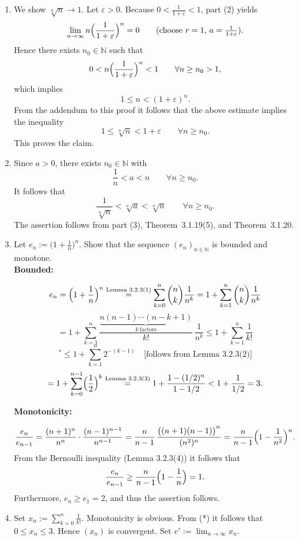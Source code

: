 \documentclass[12pt]{article}
\newcommand{\N}{\mathbb{N}}
\newcommand{\eps}{\varepsilon}
\begin{document}
\begin{enumerate}[label=(\arabic*),leftmargin=*]
    \item We show $\sqrt[n]{n}\to 1$. Let $\eps>0$. Because $0<\frac1{1+\eps}<1$, part (2) yields
    \[
        \lim_{n\to\infty} n\Bigl(\frac1{1+\eps}\Bigr)^n = 0
        \qquad\text{(choose $r=1$, $a=\tfrac1{1+\eps}$).}
    \]
    Hence there exists $n_0\in\N$ such that
    \[
        0 < n\Bigl(\frac1{1+\eps}\Bigr)^n < 1 \qquad\forall n\ge n_0 > 1,
    \]
    which implies
    \[
        1 \le n < (1+\eps)^n.
    \]
    From the addendum to this proof it follows that the above estimate implies the inequality
    \[
        1 \le \sqrt[n]{n} < 1+\eps \qquad\forall n\ge n_0.
    \]
    This proves the claim.

    \item Since $a>0$, there exists $n_0\in\N$ with
    \[
        \frac1n < a < n \qquad\forall n\ge n_0.
    \]
    It follows that
    \[
        \frac1{\sqrt[n]{n}} < \sqrt[n]{a} < \sqrt[n]{n} \qquad\forall n\ge n_0.
    \]
    The assertion follows from part (3), Theorem~3.1.19(5), and Theorem~3.1.20.

    \item Let $e_n := \bigl(1+\tfrac1n\bigr)^n$. Show that the sequence $(e_n)_{n\in\N}$ is bounded and monotone. \\
\textbf{Bounded:}

\[
e_n = \Bigl(1 + \frac{1}{n}\Bigr)^n
\overset{\text{Lemma 3.2.3(1)}}{=}
\sum_{k=0}^{n} \binom{n}{k}\frac{1}{n^k}
= 1 + \sum_{k=1}^{n} \binom{n}{k}\frac{1}{n^k}
\]
\[
= 1 + \sum_{k=1}^{n}
\frac{\underbrace{n(n-1)\cdots (n-k+1)}_{k\ \text{factors}}}{k!}\,
\frac{1}{n^k}
\le 1 + \sum_{k=1}^{n} \frac{1}{k!}
\]
\[
{}^{*}\le 1 + \sum_{k=1}^{n} 2^{-(k-1)}
\quad\text{[follows from Lemma 3.2.3(2)]}
\]
\[
= 1 + \sum_{k=0}^{n-1} \Bigl(\frac12\Bigr)^{k}
\overset{\text{Lemma 3.2.3(3)}}{=}
1 + \frac{1 - (1/2)^n}{1 - 1/2}
< 1 + \frac{1}{1/2}
= 3.
\]

\textbf{Monotonicity:}

\[
\frac{e_n}{e_{n-1}}
= \frac{(n+1)^n}{n^n}\cdot\frac{(n-1)^{n-1}}{n^{n-1}}
= \frac{n}{n-1}\,\frac{\bigl((n+1)(n-1)\bigr)^n}{(n^2)^n}
= \frac{n}{n-1}\Bigl(1 - \frac{1}{n^2}\Bigr)^n.
\]
From the Bernoulli inequality (Lemma 3.2.3(4)) it follows that
\[
\frac{e_n}{e_{n-1}}
\ge \frac{n}{n-1}\Bigl(1 - \frac{1}{n}\Bigr)
= 1.
\]
Furthermore, $e_n \ge e_1 = 2$, and thus the assertion follows.

\item Set $x_n := \sum_{k=0}^{n} \frac{1}{k!}$. Monotonicity is obvious. From (*) it follows that $0 \le x_n \le 3$. Hence $(x_n)$ is convergent. Set $e' := \lim_{n\to\infty} x_n$.


\end{enumerate}
\end{document}
